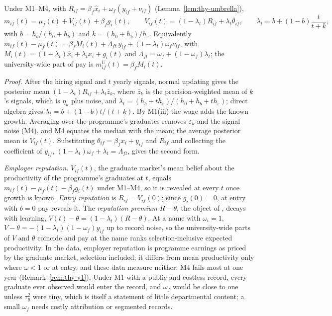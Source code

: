 \begin{thylemma}\label{lem:thy-wage}
Under M1--M4, with $R_{if}=\beta_f\hat x_i+\omega_f(y_{if}+\nu_{if})$ (Lemma~\ref{lem:thy-umbrella}),
\[
m_{if}(t)=\mu_f(t)+V_{if}(t)+\beta_fg_i(t),\qquad V_{if}(t)=(1-\lambda_t)R_{if}+\lambda_t\theta_{if},\qquad
\lambda_t=b+(1-b)\frac{t}{t+k},
\]
with $b=h_b/(h_0+h_b)$ and $k=(h_0+h_b)/h_\varepsilon$. Equivalently
$m_{if}(t)-\mu_f(t)=\beta_fM_i(t)+\Lambda_{ft}\,y_{if}+(1-\lambda_t)\omega_f\nu_{if}$, with
$M_i(t)=(1-\lambda_t)\hat x_i+\lambda_tx_i+g_i(t)$ and $\Lambda_{ft}=\omega_f+(1-\omega_f)\lambda_t$; the
university-wide part of pay is $m^U_{if}(t)=\beta_fM_i(t)$.
\end{thylemma}

\emph{Proof.} After the hiring signal and $t$ yearly signals, normal updating gives the posterior mean
$(1-\lambda_t)R_{if}+\lambda_t\bar z_k$, where $\bar z_k$ is the precision-weighted mean of $k$'s signals, which is
$\eta_k$ plus noise, and $\lambda_t=(h_b+th_\varepsilon)/(h_0+h_b+th_\varepsilon)$; direct algebra gives
$\lambda_t=b+(1-b)t/(t+k)$. By M1(iii) the wage adds the known growth. Averaging over the programme's graduates
removes $\varepsilon_k$ and the signal noise (M4), and M4 equates the median with the mean; the average posterior
mean is $V_{if}(t)$. Substituting $\theta_{if}=\beta_fx_i+y_{if}$ and $R_{if}$ and collecting the coefficient of
$y_{if}$, $(1-\lambda_t)\omega_f+\lambda_t=\Lambda_{ft}$, gives the second form. \thyqed

\emph{Employer reputation.} $V_{if}(t)$, the graduate market's mean belief about the productivity of the programme's
graduates at $t$, equals $m_{if}(t)-\mu_f(t)-\beta_fg_i(t)$ under M1--M4, so it is revealed at every $t$ once growth
is known. \emph{Entry reputation} is $R_{if}=V_{if}(0)$; since $g_i(0)=0$, at entry with $b=0$ pay reveals it. The
\emph{reputation premium} $R-\theta$, the object of \citet{macleod2017big}, decays with learning,
$V(t)-\theta=(1-\lambda_t)(R-\theta)$. At a name with $\omega_i=1$, $V-\theta=-(1-\lambda_t)(1-\omega_f)y_{if}$ up to
record noise, so the university-wide parts of $V$ and $\theta$ coincide and pay at the name ranks selection-inclusive
expected productivity. In the data, employer reputation is programme earnings as priced by the graduate market,
selection included; it differs from mean productivity only where $\omega<1$ or at entry, and these data measure
neither: M4 fails most at one year (Remark~\ref{rem:thy-y1}). Under M1 with a public and costless record, every
graduate ever observed would enter the record, and $\omega_f$ would be close to one unless $\tau_y^2$ were tiny, which
is itself a statement of little departmental content; a small $\omega_f$ needs costly attribution or segmented
records.

